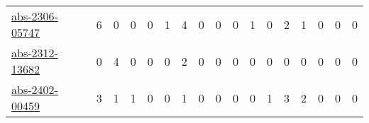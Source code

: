 {\begin{longtable}{l*{16}{r}}
\href{articles/abs-2306-05747.pdf}{abs-2306-05747}~\cite{abs-2306-05747} & 6 & 0 & 0 & 0 & 1 & 4 & 0 & 0 & 0 & 1 & 0 & 2 & 1 & 0 & 0 & 0\\
\href{articles/abs-2312-13682.pdf}{abs-2312-13682}~\cite{abs-2312-13682} & 0 & 4 & 0 & 0 & 0 & 2 & 0 & 0 & 0 & 0 & 0 & 0 & 0 & 0 & 0 & 0\\
\href{articles/abs-2402-00459.pdf}{abs-2402-00459}~\cite{abs-2402-00459} & 3 & 1 & 1 & 0 & 0 & 1 & 0 & 0 & 0 & 0 & 1 & 3 & 2 & 0 & 0 & 0\\
\end{longtable}
}

